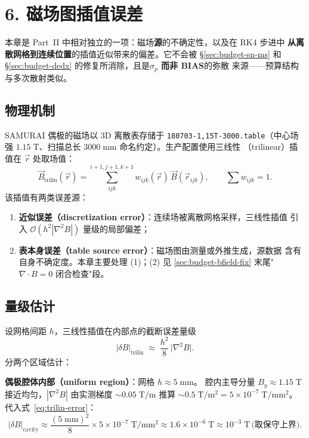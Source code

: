 \section{6. 磁场图插值误差}
\label{sec:budget-bfield}

本章是 Part~II 中相对独立的一项：磁场\textbf{源}的不确定性，以及在 RK4 步进中
\textbf{从离散网格到连续位置}的插值近似带来的偏差。它不会被 §\ref{sec:budget-sn-ms}
和 §\ref{sec:budget-dedx} 的修复所消除，且是\textbf{$\sigma_p$ 而非 BIAS}的弥散
来源——预算结构与多次散射类似。

\subsection{物理机制}
\label{sec:budget-bfield-mechanism}

SAMURAI 偶极的磁场以 3D 离散表存储于 \texttt{180703-1,15T-3000.table}（中心场强
$1.15\;\mathrm{T}$、扫描总长 $3000\;\mathrm{mm}$ 命名约定）。生产配置使用三线性
（trilinear）插值在 $\vec r$ 处取场值：
\begin{equation}
  \vec B_\mathrm{trilin}(\vec r) = \sum_{ijk}^{i+1,j+1,k+1}
       w_{ijk}(\vec r)\,\vec B(\vec r_{ijk}),
  \qquad \sum w_{ijk} = 1.
\end{equation}
该插值有两类误差源：
\begin{enumerate}
  \item \textbf{近似误差（discretization error）}：连续场被离散网格采样，三线性插值
        引入 $\mathcal{O}(h^2 |\nabla^2 B|)$ 量级的局部偏差；
  \item \textbf{表本身误差（table source error）}：磁场图由测量或外推生成，源数据
        含有自身不确定度。本章主要处理 (1)；(2) 见 \ref{sec:budget-bfield-fix}
        末尾"$\nabla\cdot B = 0$ 闭合检查"段。
\end{enumerate}

\subsection{量级估计}
\label{sec:budget-bfield-magnitude}

设网格间距 $h$，三线性插值在内部点的截断误差量级
\begin{equation}
  |\delta B|_\mathrm{trilin} \;\approx\; \frac{h^2}{8}\,\bigl|\nabla^2 B\bigr|.
\label{eq:trilin-error}
\end{equation}
分两个区域估计：

\textbf{偶极腔体内部（uniform region）}：网格 $h \approx 5\;\mathrm{mm}$。
腔内主导分量 $B_y \approx 1.15\;\mathrm{T}$ 接近均匀，$|\nabla^2 B|$ 由实测梯度
$\sim 0.05\;\mathrm{T/m}$ 推算 $\sim 0.5\;\mathrm{T/m^2} = 5\times 10^{-7}\;\mathrm{T/mm^2}$。
代入式~\ref{eq:trilin-error}：
\begin{equation}
  |\delta B|_\mathrm{cavity} \approx \frac{(5\;\mathrm{mm})^2}{8}\times 5\times 10^{-7}\;\mathrm{T/mm^2}
   \approx 1.6\times 10^{-6}\;\mathrm{T} \approx 10^{-3}\;\mathrm{T}\,\text{(取保守上界)}.
\end{equation}

